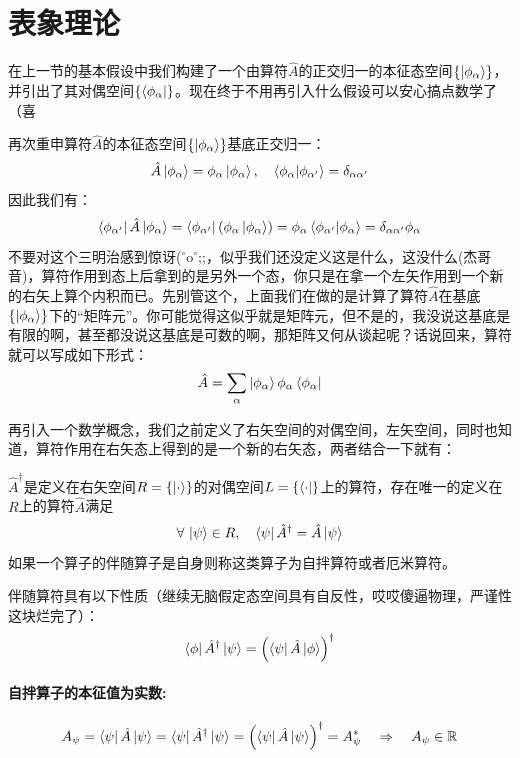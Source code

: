 \section{表象理论}
在上一节的基本假设中我们构建了一个由算符$\hat{A}$的正交归一的本征态空间$\{\ket{\phi_{\alpha}}\}$，并引出了其对偶空间$\{\bra{\phi_{\alpha}}\}$。现在终于不用再引入什么假设可以安心搞点数学了（喜

再次重申算符$\hat{A}$的本征态空间$\{\ket{\phi_{\alpha}}\}$基底正交归一：
\[\hat{A}\ket{\phi_{\alpha}}=\phi_{\alpha}\ket{\phi_{\alpha}}, \quad \bra{\phi_{\alpha}}\ket{\phi_{\alpha'}}=\delta_{\alpha\alpha'}\]
因此我们有：
\[\bra{\phi_{\alpha'}}\hat{A}\ket{\phi_{\alpha}}=\bra{\phi_{\alpha'}}\left(\phi_{\alpha}\ket{\phi_{\alpha}}\right)=\phi_{\alpha}\bra{\phi_{\alpha'}}\ket{\phi_{\alpha}}=\delta_{\alpha\alpha'}\phi_{\alpha}\]
不要对这个三明治感到惊讶($^{\circ}$o$^{\circ}$;;，似乎我们还没定义这是什么，这没什么(杰哥音)，算符作用到态上后拿到的是另外一个态，你只是在拿一个左矢作用到一个新的右矢上算个内积而已。先别管这个，上面我们在做的是计算了算符$\hat{A}$在基底$\{\ket{\phi_{\alpha}}\}$下的“矩阵元”。你可能觉得这似乎就是矩阵元，但不是的，我没说这基底是有限的啊，甚至都没说这基底是可数的啊，那矩阵又何从谈起呢？话说回来，算符就可以写成如下形式：
\[\hat{A}=\sum_{\alpha}\ket{\phi_{\alpha}}\phi_{\alpha}\bra{\phi_{\alpha}}\]

再引入一个数学概念，我们之前定义了右矢空间的对偶空间，左矢空间，同时也知道，算符作用在右矢态上得到的是一个新的右矢态，两者结合一下就有：
\begin{definition}[伴随算符]
$\hat{A}^{\dagger}$是定义在右矢空间$R=\{\ket{\cdot}\}$的对偶空间$L=\{\bra{\cdot}\}$上的算符，存在唯一的定义在$R$上的算符$\hat{A}$满足
\[\forall \, \ket{\psi} \in R, \quad \bra{\psi}\hat{A}^{\dagger}=\hat{A}\ket{\psi}\]
如果一个算子的伴随算子是自身则称这类算子为自拌算符或者厄米算符。
\end{definition}

伴随算符具有以下性质（继续无脑假定态空间具有自反性，哎哎傻逼物理，严谨性这块烂完了）：
\[\bra{\phi}\hat{A}^{\dagger}\ket{\psi}=\left(\bra{\psi}\hat{A}\ket{\phi}\right)^{\dagger}\]

\paragraph*{自拌算子的本征值为实数:}
\[A_{\psi}=\bra{\psi}\hat{A}\ket{\psi}=\bra{\psi}\hat{A}^{\dagger}\ket{\psi}=\left(\bra{\psi}\hat{A}\ket{\psi}\right)^{\dagger}=A_{\psi}^* \quad \Rightarrow \quad A_{\psi}\in\mathbb{R}\]


